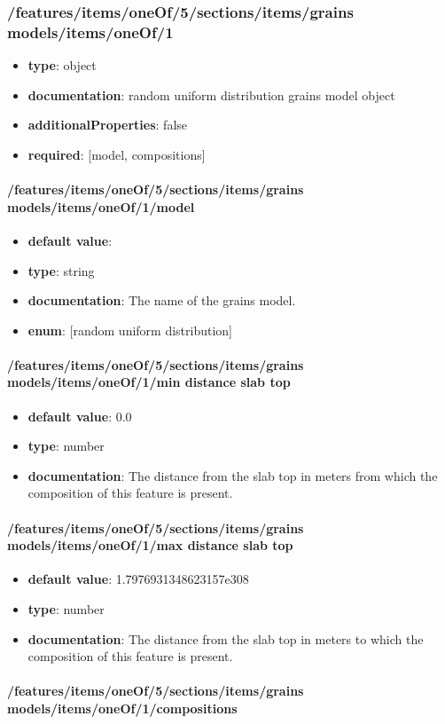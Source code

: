 \subsubsection{/features/items/oneOf/5/sections/items/grains models/items/oneOf/1}
\begin{itemize}\item {\bf type}: object
\item {\bf documentation}: random uniform distribution grains model object
\item {\bf additionalProperties}: false
\item {\bf required}: [model, compositions]\end{itemize}
\paragraph{/features/items/oneOf/5/sections/items/grains models/items/oneOf/1/model}
\begin{itemize}\item {\bf default value}: 
\item {\bf type}: string
\item {\bf documentation}: The name of the grains model.
\item {\bf enum}: [random uniform distribution]\end{itemize}\paragraph{/features/items/oneOf/5/sections/items/grains models/items/oneOf/1/min distance slab top}
\begin{itemize}\item {\bf default value}: 0.0
\item {\bf type}: number
\item {\bf documentation}: The distance from the slab top in meters from which the composition of this feature is present.
\end{itemize}\paragraph{/features/items/oneOf/5/sections/items/grains models/items/oneOf/1/max distance slab top}
\begin{itemize}\item {\bf default value}: 1.7976931348623157e308
\item {\bf type}: number
\item {\bf documentation}: The distance from the slab top in meters to which the composition of this feature is present.
\end{itemize}\paragraph{/features/items/oneOf/5/sections/items/grains models/items/oneOf/1/compositions}
